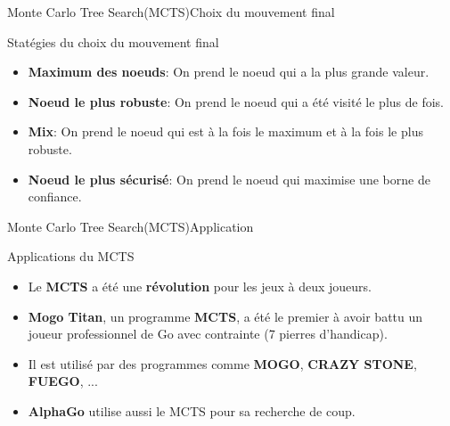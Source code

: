 \begin{frame}{Monte Carlo Tree Search(MCTS)}{Choix du mouvement final}
	\begin{block}{Statégies du choix du mouvement final}
		\begin{itemize}
			\item \textbf{Maximum des noeuds}: On prend le noeud qui a la plus grande valeur.
			\item \textbf{Noeud le plus robuste}: On prend le noeud qui a été visité le plus de fois.
			\item \textbf{Mix}: On prend le noeud qui est à la fois le maximum et à la fois le plus robuste.
			\item \textbf{Noeud le plus sécurisé}: On prend le noeud qui maximise une borne de confiance.
		\end{itemize}
	\end{block}
\end{frame}

\begin{frame}{Monte Carlo Tree Search(MCTS)}{Application}
	\begin{block}{Applications du MCTS}
		\begin{itemize}
			\item Le \textbf{MCTS} a été une \textbf{révolution} pour les jeux à deux joueurs.
			\item \textbf{Mogo Titan}, un programme \textbf{MCTS}, a été le premier à avoir battu un joueur professionnel de Go avec contrainte (7 pierres d'handicap).
			\item Il est utilisé par des programmes comme \textbf{MOGO}, \textbf{CRAZY STONE}, \textbf{FUEGO}, ...
			\item \textbf{AlphaGo} utilise aussi le MCTS pour sa recherche de coup.
		\end{itemize}
	\end{block}
\end{frame}